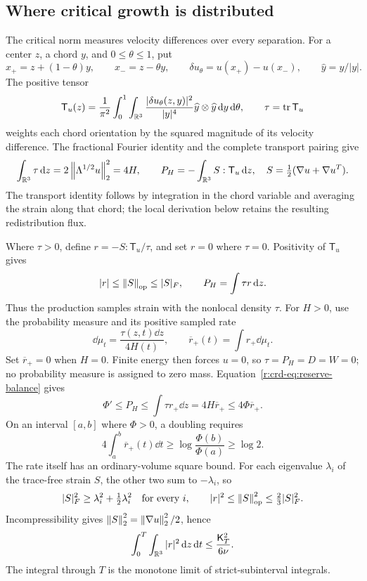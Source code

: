 \subsection{Where critical growth is distributed}

The critical norm measures velocity differences over every separation.
For a center \(z\), a chord \(y\), and \(0\le\theta\le1\), put
\[
 x_+=z+(1-\theta)y,\qquad x_-=z-\theta y,\qquad
 \delta u_\theta=u(x_+)-u(x_-),\qquad \widehat y=y/|y|.
\]
The positive tensor
\begin{equation}
 \mathsf T_u(z)=\frac1{\pi^2}\int_0^1\int_{\mathbb R^3}
 \frac{|\delta u_\theta(z,y)|^2}{|y|^4}
 \widehat y\otimes\widehat y\,\mathrm d y\,\mathrm d\theta,\qquad
 \tau=\operatorname{tr}\mathsf T_u
 \label{r:crd-eq:tensor}
\end{equation}
weights each chord orientation by the squared magnitude of its velocity difference.
The fractional Fourier identity and the complete transport pairing give
\begin{equation}
 \int_{\mathbb R^3}\tau\,\mathrm d z=2\left\lVert \Lambda^{1/2}u\right\rVert_2^2=4H,\qquad
 P_H=-\int_{\mathbb R^3}S:\mathsf T_u\,\mathrm d z,
 \quad S=\tfrac12(\nabla u+\nabla u^T).
 \label{r:crd-eq:current}
\end{equation}
The transport identity follows by integration in the chord variable and
averaging the strain along that chord; the local derivation below retains
the resulting redistribution flux.

Where \(\tau>0\), define \(r=-S:\mathsf T_u/\tau\), and set \(r=0\)
where \(\tau=0\). Positivity of \(\mathsf T_u\) gives
\[
 |r|\le\left\lVert S\right\rVert_{\mathrm{op}}\le |S|_F,\qquad
 P_H=\int\tau r\,\mathrm d z.
\]
Thus the production samples strain with the nonlocal density \(\tau\).
For \(H>0\), use the probability measure and its positive sampled rate
\[
 \dd\mu_t=\frac{\tau(z,t)\dd z}{4H(t)},\qquad
 \overline r_+(t)=\int r_+\dd\mu_t.
\]
Set \(\overline r_+=0\) when \(H=0\). Finite energy then forces \(u=0\),
so \(\tau=P_H=D=W=0\); no probability measure is assigned to zero mass.
Equation~\eqref{r:crd-eq:reserve-balance} gives
\begin{equation}
 \Phi'\le P_H\le\int\tau r_+\dd z
 =4H\overline r_+\le4\Phi\overline r_+.
 \label{r:crd-eq:sampled-growth}
\end{equation}
On an interval \([a,b]\) where \(\Phi>0\), a doubling requires
\[
 4\int_a^b\overline r_+(t)\dd t
 \ge\log\frac{\Phi(b)}{\Phi(a)}\ge\log2.
\]
The rate itself has an ordinary-volume square bound. For each eigenvalue
\(\lambda_i\) of the trace-free strain \(S\), the other two sum to
\(-\lambda_i\), so
\[
 |S|_F^2\ge\lambda_i^2+\tfrac12\lambda_i^2
 \quad\text{for every }i,\qquad
 |r|^2\le\left\lVert S\right\rVert_{\mathrm{op}}^2\le\tfrac23|S|_F^2.
\]
Incompressibility gives \(\left\lVert S\right\rVert_2^2=\left\lVert \nabla u\right\rVert_2^2/2\), hence
\begin{equation}
 \int_0^T\int_{\mathbb R^3}|r|^2\,\mathrm d z\,\mathrm d t
 \le\frac{\mathsf K_T^2}{6\nu}.
 \label{r:crd-eq:rate-budget}
\end{equation}
The integral through \(T\) is the monotone limit of strict-subinterval
integrals.

